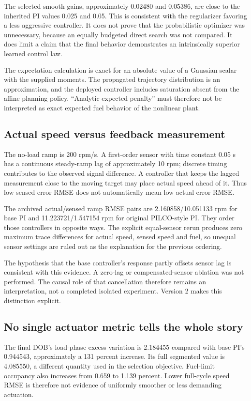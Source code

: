 The selected smooth gains, approximately 0.02480 and 0.05386, are close to the inherited PI values 0.025 and 0.05. This is consistent with the regularizer favoring a less aggressive controller. It does not prove that the probabilistic optimizer was unnecessary, because an equally budgeted direct search was not compared. It does limit a claim that the final behavior demonstrates an intrinsically superior learned control law.

The expectation calculation is exact for an absolute value of a Gaussian scalar with the supplied moments. The propagated trajectory distribution is an approximation, and the deployed controller includes saturation absent from the affine planning policy. ``Analytic expected penalty'' must therefore not be interpreted as exact expected fuel behavior of the nonlinear plant.

\subsection{Actual speed versus feedback measurement}
The no-load ramp is 200 rpm/s. A first-order sensor with time constant 0.05 s has a continuous steady-ramp lag of approximately 10 rpm; discrete timing contributes to the observed signal difference. A controller that keeps the lagged measurement close to the moving target may place actual speed ahead of it. Thus low sensed-error RMSE does not automatically mean low actual-error RMSE.

The archived actual/sensed ramp RMSE pairs are 2.160858/10.051133 rpm for base PI and 11.223721/1.547154 rpm for original PILCO-style PI. They order those controllers in opposite ways. The explicit equal-sensor rerun produces zero maximum trace differences for actual speed, sensed speed and fuel, so unequal sensor settings are ruled out as the explanation for the previous ordering.

The hypothesis that the base controller's response partly offsets sensor lag is consistent with this evidence. A zero-lag or compensated-sensor ablation was not performed. The causal role of that cancellation therefore remains an interpretation, not a completed isolated experiment. Version 2 makes this distinction explicit.

\subsection{No single actuator metric tells the whole story}
The final DOB's load-phase excess variation is 2.184455 compared with base PI's 0.944543, approximately a 131 percent increase. Its full segmented value is 4.085550, a different quantity used in the selection objective. Fuel-limit occupancy also increases from 0.659 to 1.139 percent. Lower full-cycle speed RMSE is therefore not evidence of uniformly smoother or less demanding actuation.

